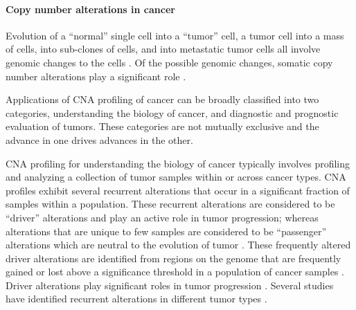 \paragraph{Copy number alterations in cancer}
Evolution of a ``normal'' single cell into a ``tumor'' cell, a tumor
cell into a mass of cells, into sub-clones of cells, and into metastatic
tumor cells all involve genomic changes to the cells
\citep{stratton2009cancer}. Of the possible genomic changes, somatic copy
number alterations play a significant role
\citep{beroukhim2010landscape,zack2013pan}.

Applications of CNA profiling of cancer can be broadly classified into
two categories, understanding the biology of cancer, and diagnostic and
prognostic evaluation of tumors. These categories are not mutually
exclusive and the advance in one drives advances in the other.

CNA profiling for understanding the biology of cancer typically involves
profiling and analyzing a collection of tumor samples within or across
cancer types.
%
CNA profiles exhibit several recurrent alterations that occur in a
significant fraction of samples within a population. These recurrent
alterations are considered to be ``driver'' alterations and play an
active role in tumor progression; whereas alterations that are unique to
few samples are considered to be ``passenger'' alterations which are
neutral to the evolution of tumor \citep{bignell2010signatures,
beroukhim2010landscape}.
%
These frequently altered driver alterations are identified from regions
on the genome that are frequently gained or lost above a significance
threshold in a population of cancer samples \citep{mermel2011gistic2}.
%
Driver alterations play significant roles in tumor progression
\citep{bignell2010signatures, beroukhim2010landscape}.  Several studies
have identified recurrent alterations in different tumor types
\citep{beroukhim2007assessing,etemadmoghadam2009integrated,
weir2007characterizing,lin2008modeling}.



